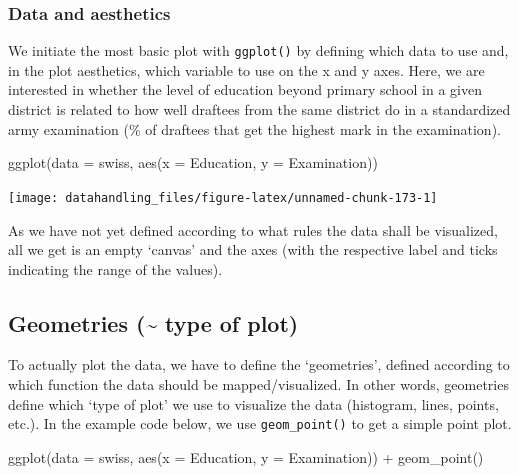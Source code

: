 \documentclass[
  12pt,
]{style/krantz}
\newenvironment{Shaded}{\begin{snugshade}}{\end{snugshade}}
\newcommand{\AttributeTok}[1]{\textcolor[rgb]{0.77,0.63,0.00}{#1}}
\newcommand{\FunctionTok}[1]{\textcolor[rgb]{0.00,0.00,0.00}{#1}}
\newcommand{\NormalTok}[1]{#1}
\newcommand{\SpecialCharTok}[1]{\textcolor[rgb]{0.00,0.00,0.00}{#1}}
\begin{document}
\hypertarget{data-and-aesthetics}{%
\subsubsection{Data and aesthetics}\label{data-and-aesthetics}}

We initiate the most basic plot with \texttt{ggplot()} by defining which data to use and, in the plot aesthetics, which variable to use on the x and y axes. Here, we are interested in whether the level of education beyond primary school in a given district is related to how well draftees from the same district do in a standardized army examination (\% of draftees that get the highest mark in the examination).

\begin{Shaded}
\begin{Highlighting}[]
\FunctionTok{ggplot}\NormalTok{(}\AttributeTok{data =}\NormalTok{ swiss, }\FunctionTok{aes}\NormalTok{(}\AttributeTok{x =}\NormalTok{ Education, }\AttributeTok{y =}\NormalTok{ Examination))}
\end{Highlighting}
\end{Shaded}

\texttt{[image: datahandling\_files/figure-latex/unnamed-chunk-173-1]}

As we have not yet defined according to what rules the data shall be visualized, all we get is an empty `canvas' and the axes (with the respective label and ticks indicating the range of the values).

\hypertarget{geometries-type-of-plot}{%
\subsection{Geometries (\textasciitilde{} type of plot)}\label{geometries-type-of-plot}}

To actually plot the data, we have to define the `geometries', defined according to which function the data should be mapped/visualized. In other words, geometries define which `type of plot' we use to visualize the data (histogram, lines, points, etc.). In the example code below, we use \texttt{geom\_point()} to get a simple point plot.

\begin{Shaded}
\begin{Highlighting}[]
\FunctionTok{ggplot}\NormalTok{(}\AttributeTok{data =}\NormalTok{ swiss, }\FunctionTok{aes}\NormalTok{(}\AttributeTok{x =}\NormalTok{ Education, }\AttributeTok{y =}\NormalTok{ Examination)) }\SpecialCharTok{+}
     \FunctionTok{geom\_point}\NormalTok{()}
\end{Highlighting}
\end{Shaded}
\end{document}
